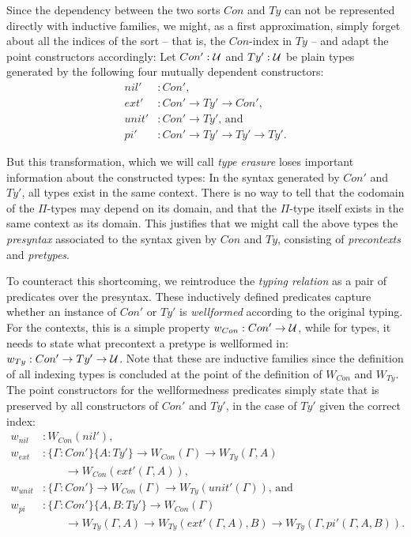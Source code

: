 Since the dependency between the two sorts $Con$ and $Ty$ can not be represented
directly with inductive families, we might, as a first approximation, simply forget
about all the indices of the sort -- that is, the $Con$-index in $Ty$ --
and adapt the point constructors accordingly:
Let $Con' : \mathcal{U}$ and $Ty' : \mathcal{U}$ be plain types generated by the following four
mutually dependent constructors:
\begin{align*}
nil' &: Con' \text{,} \\
ext' &: Con' \to Ty' \to Con' \text{,} \\
unit' &: Con' \to Ty' \text{, and} \\
pi' &: Con' \to Ty' \to Ty' \to Ty' \text{.}
\end{align*}

But this transformation, which we will call \emph{type erasure} loses important
information about the constructed types:
In the syntax generated by $Con'$ and $Ty'$, all types exist in the same context.
There is no way to tell that the codomain of the $\Pi$-types may depend on its domain,
and that the $\Pi$-type itself exists in the same context as its domain.
This justifies that we might call the above types the \emph{presyntax} associated
to the syntax given by $Con$ and $Ty$, consisting of \emph{precontexts} and
\emph{pretypes}.

To counteract this shortcoming, we reintroduce the \emph{typing relation} as a pair of
predicates over the presyntax.
These inductively defined predicates capture whether an instance of $Con'$ or $Ty'$ is \emph{wellformed} according to the original typing.
For the contexts, this is a simple property $w_{Con} : Con' \to \mathcal{U}$, while for
types, it needs to state what precontext a pretype is wellformed in:
$w_{Ty} : Con' \to Ty' \to \mathcal{U}$.
Note that these are inductive families since the definition of all indexing types
is concluded at the point of the definition of $W_{Con}$ and $W_{Ty}$.
The point constructors for the wellformedness predicates simply state that
is preserved by all constructors of $Con'$ and $Ty'$, in the case of $Ty'$ given the
correct index:
\begin{align*}
w_{nil} &: W_{Con}(nil') \text{,} \\
w_{ext} &: \{\Gamma : Con'\} \{A : Ty'\}
    \to W_{Con}(\Gamma) \to W_{Ty}(\Gamma, A) \\
  & \qquad \to W_{Con}(ext'(\Gamma, A)) \text{,}\\
w_{unit} &: \{\Gamma : Con'\} \to W_{Con}(\Gamma) \to W_{Ty}(unit'(\Gamma)) \text{, and}\\
w_{pi} &: \{\Gamma : Con'\} \{A, B : Ty'\} \to
    W_{Con}(\Gamma) \\
  & \qquad \to W_{Ty}(\Gamma, A) \to W_{Ty}(ext'(\Gamma, A), B)
    \to W_{Ty}(\Gamma, pi'(\Gamma, A, B)) \text{.}
\end{align*}

